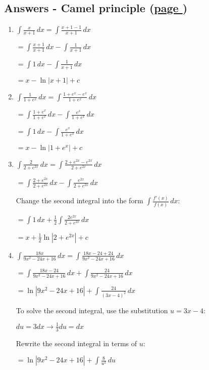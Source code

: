 \documentclass[../main.tex]{subfiles}
\begin{document}
\hypertarget{camelprincipleanswers}{\subsection*{Answers - Camel principle (\hyperlink{camelprinciplelink}{page \pageref{Camel Principle}})}}

\label{Camel principle answers}
\begin{enumerate}
    \item
    \(\int \frac{x}{x+1}\,dx=\int \frac{x + 1 - 1}{x+1}\,dx\)

    \(= \int \frac{x+1}{x+1}\,dx - \int \frac{1}{x+1}\,dx\)

    \(= \int 1\,dx - \int \frac{1}{x+1}\,dx\)

    \(= x - \ln{|x+1|}+c\)

    \item 
    \(\int \frac{1}{1+e^x}\,dx=\int \frac{1+e^x-e^x}{1+e^x}\,dx\)
    
    \(= \int \frac{1+e^x}{1+e^x}\,dx-\int \frac{e^x}{1+e^x}\,dx\)

    \(= \int 1\,dx-\int \frac{e^x}{1+e^x}\,dx\)

    \(= x-\ln{|1+e^x|}+c\)
    
    \item
    \(\int \frac{2}{2 + e^{2x}}\,dx = \int \frac{2+e^{2x}-e^{2x}}{2+e^{2x}}\,dx\)
    
    \(= \int \frac{2+e^{2x}}{2+e^{2x}}\,dx - \int \frac{e^{2x}}{2+e^{2x}}\,dx\)

    Change the second integral into the form $\int \frac{f'(x)}{f(x)}\,dx$:

    \(= \int 1\,dx + \frac{1}{2}\int \frac{2e^{2x}}{2+e^{2x}}\,dx\) 

    \(= x + \frac{1}{2}\ln{|2+e^{2x}|}+c\)

    \item
    \(\int \frac{18x}{9x^2 -24x + 16}\,dx = \int \frac{18x - 24 + 24}{9x^2 - 24x + 16}\,dx\)

    \(= \int \frac{18x - 24}{9x^2-24x+16}\,dx + \int \frac{24}{9x^2-24x+16}\,dx\)

    \(= \ln{|9x^2-24x+16|} + \int \frac{24}{(3x-4)^2}\,dx\)

    To solve the second integral, use the substitution $u=3x-4$:

    $du = 3 dx \rightarrow \frac{1}{3}du = dx$

    Rewrite the second integral in terms of $u$:

    \(= \ln{|9x^2-24x+16|} + \int \frac{8}{u^2}\,du\)


\end{enumerate}
\end{document}
